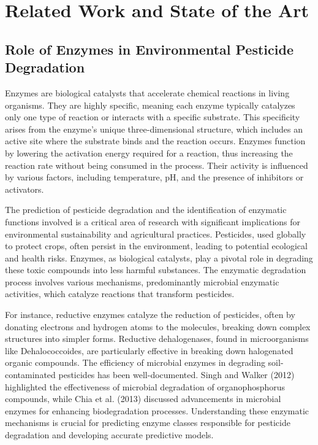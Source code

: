 \section{Related Work and State of the Art}

\subsection{Role of Enzymes in Environmental Pesticide Degradation}
\label{sec:Role of Enzymes in Environmental Pesticide Degradation}

Enzymes are biological catalysts that accelerate chemical reactions in living organisms. They are highly specific, meaning each enzyme typically catalyzes only one type of reaction or interacts with a specific substrate. This specificity arises from the enzyme’s unique three-dimensional structure, which includes an active site where the substrate binds and the reaction occurs. Enzymes function by lowering the activation energy required for a reaction, thus increasing the reaction rate without being consumed in the process. Their activity is influenced by various factors, including temperature, pH, and the presence of inhibitors or activators. \autocite{robinsonEnzymesPrinciplesBiotechnological2015}

The prediction of pesticide degradation and the identification of enzymatic functions involved is a critical area of research with significant implications for environmental sustainability and agricultural practices. Pesticides, used globally to protect crops, often persist in the environment, leading to potential ecological and health risks. Enzymes, as biological catalysts, play a pivotal role in degrading these toxic compounds into less harmful substances. The enzymatic degradation process involves various mechanisms, predominantly microbial enzymatic activities, which catalyze reactions that transform pesticides.

For instance, reductive enzymes catalyze the reduction of pesticides, often by donating electrons and hydrogen atoms to the molecules, breaking down complex structures into simpler forms. Reductive dehalogenases, found in microorganisms like Dehalococcoides, are particularly effective in breaking down halogenated organic compounds. The efficiency of microbial enzymes in degrading soil-contaminated pesticides has been well-documented. Singh and Walker (2012) \autocite{singhMicrobialDegradationOrganophosphorus2006} highlighted the effectiveness of microbial degradation of organophosphorus compounds, while Chia et al. (2013) \autocite{chiaFunctionMicrobialEnzymes2024} discussed advancements in microbial enzymes for enhancing biodegradation processes. Understanding these enzymatic mechanisms is crucial for predicting enzyme classes responsible for pesticide degradation and developing accurate predictive models.

